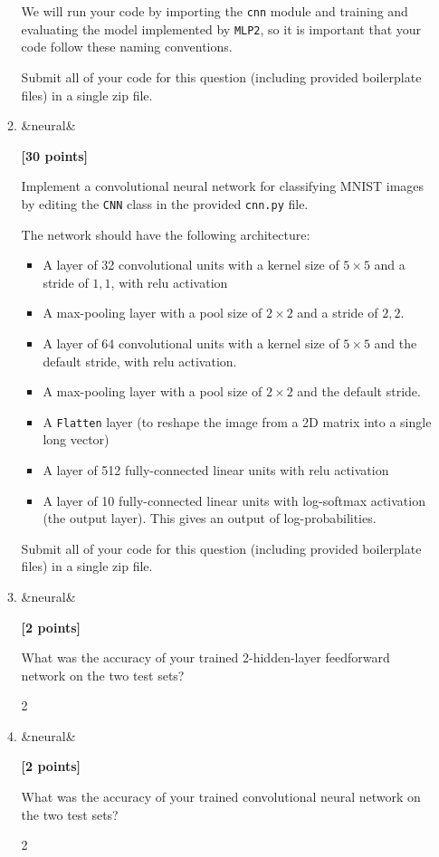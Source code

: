 \documentclass{article}
\newcounter{totalpoints}
\newcommand{\points}[2][]{{\addtocounter{totalpoints}{#2}\ifx&#1&\else\addtocounter{#1}{#2}\fi\textbf{[#2 points]}}}
\begin{document}
\begin{enumerate}
\begin{enumerate}
We will run your code by importing the \verb|cnn| module and training and evaluating the model implemented by \verb|MLP2|, so it is important that your code follow these naming conventions.

Submit all of your code for this question (including provided boilerplate files) in a single zip file.

\item\points[neural]{30}
Implement a convolutional neural network for classifying MNIST images by editing the \verb|CNN| class in the provided \texttt{cnn.py} file.

The network should have the following architecture:
\begin{itemize}
\item A layer of 32 convolutional units with a kernel size of $5\times5$ and a stride of $1,1$, with relu activation
\item A max-pooling layer with a pool size of $2\times2$ and a stride of $2,2$.
\item A layer of 64 convolutional units with a kernel size of $5\times5$ and the default stride, with relu activation.
\item A max-pooling layer with a pool size of $2\times2$ and the default stride.
\item A \verb|Flatten| layer (to reshape the image from a 2D matrix into a single long vector)
\item A layer of 512 fully-connected linear units with relu activation
\item A layer of 10 fully-connected linear units with log-softmax activation (the output layer).
This gives an output of log-probabilities.
\end{itemize}

Submit all of your code for this question (including provided boilerplate files) in a single zip file.
\clearpage
\item \points[neural]{2} \label{q:mlp2}
What was the accuracy of your trained 2-hidden-layer feedforward network on the two test sets?
\begin{answer}{2\baselineskip}
\end{answer}

\item \points[neural]{2} \label{q:cnn}
What was the accuracy of your trained convolutional neural network on the two test sets?
\begin{answer}{2\baselineskip}
\end{answer}


\end{enumerate}
\end{enumerate}
\end{document}
